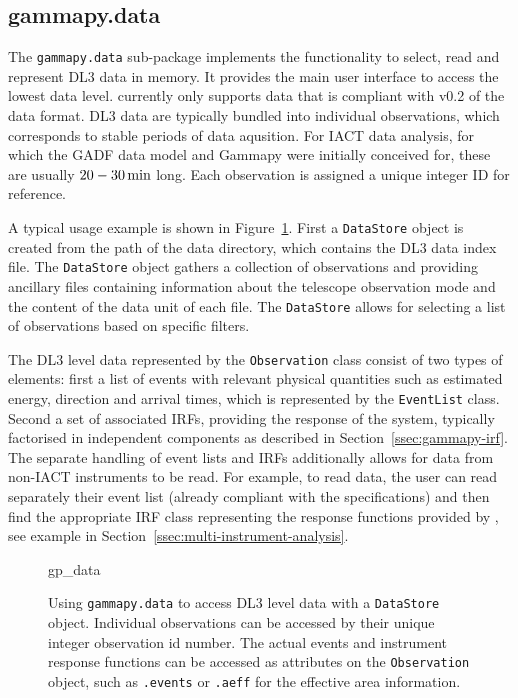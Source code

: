 \documentclass[traditabstract, longauth]{aa}
\newcommand{\code}[1]{\texttt{#1}}
\begin{document}
\subsection{gammapy.data}
\label{ssec:gammapy-data}
The \code{gammapy.data} sub-package implements the functionality to select,
read and represent DL3 \gammaray data in memory. It provides the main user
interface to access the lowest data level. \gammapy currently only
supports data that is compliant with v0.2 of the \gadf data format.
DL3 data are typically bundled into individual observations, which
corresponds to stable periods of data aqusition. For IACT data analysis,
for which the GADF data model and Gammapy were initially conceived for,
these are usually $20 - 30\,{\rm min}$ long.
Each observation is assigned a unique integer ID for reference.

A typical usage example is shown in Figure~\ref{fig*:minted:gp_data}.
First a \code{DataStore} object is created from the path of the data
directory, which contains the DL3 data index file. The \code{DataStore}
object gathers a collection of observations and providing ancillary
files containing information about the telescope observation mode and the
content of the data unit of each file. The \code{DataStore} allows for
selecting a list of observations based on specific filters.

The DL3 level data represented by the \code{Observation} class consist
of two types of elements: first a list of \gammaray events with relevant physical
quantities such as estimated energy, direction and arrival
times, which is represented by the \code{EventList} class. Second a set of
associated IRFs, providing the response of the system, typically
factorised in independent components as described in
Section~\ref{ssec:gammapy-irf}. The separate handling of event lists and IRFs
additionally allows for data from non-IACT \gammaray instruments to be read. For
example, to read \fermi data, the user can read separately their event list
(already compliant with the \gadf specifications) and then find the appropriate
IRF class representing the response functions provided by \fermi, see
example in Section~\ref{ssec:multi-instrument-analysis}.
%
\begin{figure}[ht!]
	{gp_data}
	\caption{
        Using \code{gammapy.data} to access DL3 level data with a \code{DataStore} object.
        Individual observations can be accessed by their unique integer observation id number.
        The actual events and instrument response functions can be accessed
        as attributes on the \code{Observation} object, such as \code{.events}
        or \code{.aeff} for the effective area information.
    }
	\label{fig*:minted:gp_data}
\end{figure}
%
\end{document}
